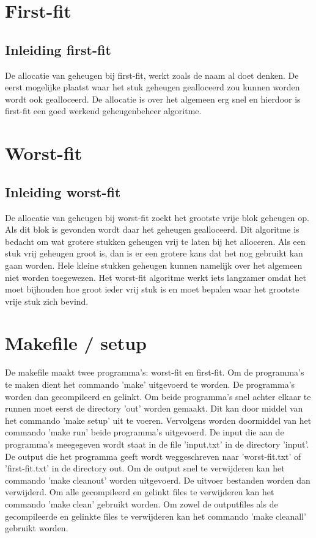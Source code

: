\documentclass[11pt]{article}
\begin{document}
	\section{First-fit}\label{sec:first-fit}
	\subsection{Inleiding first-fit}\label{sec:inleidingff}
	De allocatie van geheugen bij first-fit, werkt zoals de naam al doet denken. De eerst mogelijke plaatst waar het stuk geheugen gealloceerd zou kunnen worden wordt ook gealloceerd. De allocatie is over het algemeen erg snel en hierdoor is first-fit een goed werkend geheugenbeheer algoritme.


	\section{Worst-fit}\label{sec:worst-fit}
	\subsection{Inleiding worst-fit}\label{sec:inleidingwf}
	De allocatie van geheugen bij worst-fit zoekt het grootste vrije blok geheugen op. Als dit blok is gevonden wordt daar het geheugen gealloceerd. Dit algoritme is bedacht om wat grotere stukken geheugen vrij te laten bij het alloceren. Als een stuk vrij geheugen groot is, dan is er een grotere kans dat het nog gebruikt kan gaan worden. Hele kleine stukken geheugen kunnen namelijk over het algemeen niet worden toegewezen. Het worst-fit algoritme werkt iets langzamer omdat het moet bijhouden hoe groot ieder vrij stuk is en moet bepalen waar het grootste vrije stuk zich bevind.


	\section{Makefile / setup}\label{sec:makefile}
	De makefile maakt twee programma's: worst-fit en first-fit. Om de programma's te maken dient het commando 'make' uitgevoerd te worden. De programma's worden dan gecompileerd en gelinkt. Om beide programma's snel achter elkaar te runnen moet eerst de directory 'out' worden gemaakt. Dit kan door middel van het commando 'make setup' uit te voeren. Vervolgens worden doormiddel van het commando 'make run' beide programma's uitgevoerd. De input die aan de programma's meegegeven wordt staat in de file 'input.txt' in de directory 'input'. De output die het programma geeft wordt weggeschreven naar 'worst-fit.txt' of 'first-fit.txt' in de directory out. Om de output snel te verwijderen kan het commando 'make cleanout' worden uitgevoerd. De uitvoer bestanden worden dan verwijderd. Om alle gecompileerd en gelinkt files te verwijderen kan het commando 'make clean' gebruikt worden. Om zowel de outputfiles als de gecompileerde en gelinkte files te verwijderen kan het commando 'make cleanall' gebruikt worden.
\end{document}
